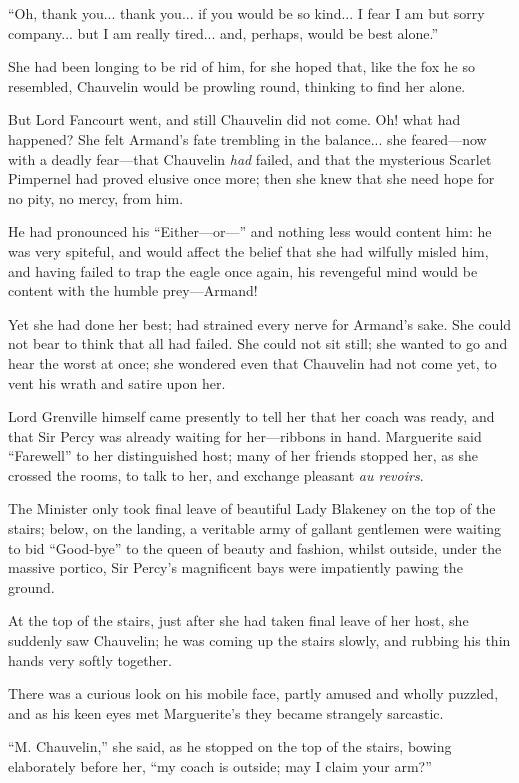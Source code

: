 \documentclass[paper=a5,BCOR=7mm,twoside,DIV=calc,12pt,usegeometry,chapterprefix,endperiod,headings=big]{scrbook}
\begin{document}
\enquote{Oh, thank you... thank you... if you would be so kind... I fear I am but sorry company... but I am really tired... and, perhaps, would be best alone.}

She had been longing to be rid of him, for she hoped that, like the fox he so resembled, Chauvelin would be prowling round, thinking to find her alone.

But Lord Fancourt went, and still Chauvelin did not come. Oh! what had happened? She felt Armand's fate trembling in the balance... she feared---now with a deadly fear---that Chauvelin \textit{had} failed, and that the mysterious Scarlet Pimpernel had proved elusive once more; then she knew that she need hope for no pity, no mercy, from him.

He had pronounced his \enquote{Either---or---} and nothing less would content him: he was very spiteful, and would affect the belief that she had wilfully misled him, and having failed to trap the eagle once again, his revengeful mind would be content with the humble prey---Armand!

Yet she had done her best; had strained every nerve for Armand's sake. She could not bear to think that all had failed. She could not sit still; she wanted to go and hear the worst at once; she wondered even that Chauvelin had not come yet, to vent his wrath and satire upon her.

Lord Grenville himself came presently to tell her that her coach was ready, and that Sir Percy was already waiting for her---ribbons in hand. Marguerite said \enquote{Farewell} to her distinguished host; many of her friends stopped her, as she crossed the rooms, to talk to her, and exchange pleasant \textit{au revoirs}.

The Minister only took final leave of beautiful Lady Blakeney on the top of the stairs; below, on the landing, a veritable army of gallant gentlemen were waiting to bid \enquote{Good-bye} to the queen of beauty and fashion, whilst outside, under the massive portico, Sir Percy's magnificent bays were impatiently pawing the ground.

At the top of the stairs, just after she had taken final leave of her host, she suddenly saw Chauvelin; he was coming up the stairs slowly, and rubbing his thin hands very softly together.

There was a curious look on his mobile face, partly amused and wholly puzzled, and as his keen eyes met Marguerite's they became strangely sarcastic.

\enquote{M. Chauvelin,} she said, as he stopped on the top of the stairs, bowing elaborately before her, \enquote{my coach is outside; may I claim your arm?}
\end{document}
